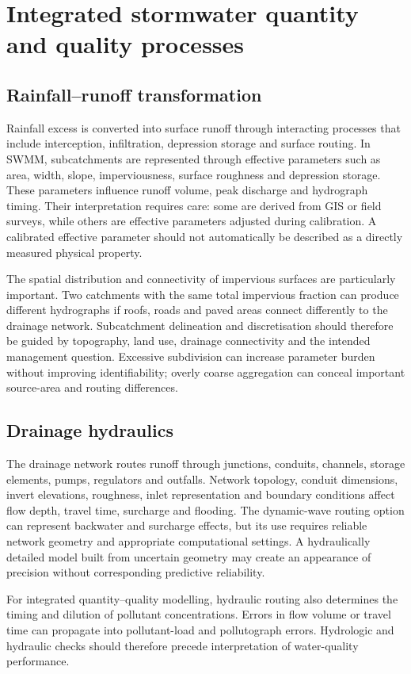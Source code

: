\documentclass[journal]{IEEEtran}
\begin{document}
\section{Integrated stormwater quantity and quality processes}
\subsection{Rainfall--runoff transformation}
Rainfall excess is converted into surface runoff through interacting processes that include interception, infiltration, depression storage and surface routing. In SWMM, subcatchments are represented through effective parameters such as area, width, slope, imperviousness, surface roughness and depression storage. These parameters influence runoff volume, peak discharge and hydrograph timing. Their interpretation requires care: some are derived from GIS or field surveys, while others are effective parameters adjusted during calibration. A calibrated effective parameter should not automatically be described as a directly measured physical property.

The spatial distribution and connectivity of impervious surfaces are particularly important. Two catchments with the same total impervious fraction can produce different hydrographs if roofs, roads and paved areas connect differently to the drainage network. Subcatchment delineation and discretisation should therefore be guided by topography, land use, drainage connectivity and the intended management question. Excessive subdivision can increase parameter burden without improving identifiability; overly coarse aggregation can conceal important source-area and routing differences.

\subsection{Drainage hydraulics}
The drainage network routes runoff through junctions, conduits, channels, storage elements, pumps, regulators and outfalls. Network topology, conduit dimensions, invert elevations, roughness, inlet representation and boundary conditions affect flow depth, travel time, surcharge and flooding. The dynamic-wave routing option can represent backwater and surcharge effects, but its use requires reliable network geometry and appropriate computational settings. A hydraulically detailed model built from uncertain geometry may create an appearance of precision without corresponding predictive reliability.

For integrated quantity--quality modelling, hydraulic routing also determines the timing and dilution of pollutant concentrations. Errors in flow volume or travel time can propagate into pollutant-load and pollutograph errors. Hydrologic and hydraulic checks should therefore precede interpretation of water-quality performance.
\end{document}
